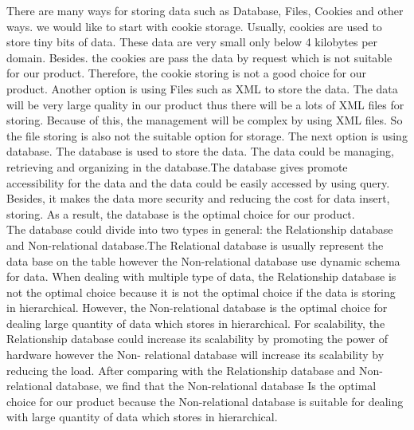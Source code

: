 \documentclass[10pt,draftclsnofoot,onecolumn,journal,compsoc]{IEEEtran}
\begin{document}
        \noindent There are many ways for storing data such as Database, Files, Cookies and other ways. we would like to start with cookie storage. Usually, cookies are used to store tiny bits of data. These data are very small only below 4 kilobytes per domain\cite{W1}. Besides. the cookies are pass the data by request which is not suitable for our product. Therefore, the cookie storing is not a good choice for our product. Another option is using Files such as XML to store the data. The data will be very large quality in our product thus there will be a lots of XML files for storing. Because of this, the management will be complex by using XML files. So the file storing is also not the suitable option for storage. The next option is using database. The database is used to store the data. The data could be managing, retrieving and organizing in the database\cite{W2}.The database gives promote accessibility for the data and the data could be easily accessed by using query. Besides, it makes the data more security and reducing the cost for data insert, storing\cite{W3}. As a result, the database is the optimal choice for our product.\\
        
        \noindent The database could divide into two types in general: the Relationship database and Non-relational database.The Relational database is usually represent the data base on the table however the Non-relational database use dynamic schema for data. When dealing with multiple type of data, the Relationship database is not the optimal choice because it is not the optimal choice if the data is storing in hierarchical. However, the Non-relational database is the optimal choice for  dealing large quantity of data which stores in hierarchical. For scalability, the Relationship database could increase its scalability by promoting the power of hardware however the Non- relational database will increase its scalability by reducing the load. After comparing with the Relationship database and Non-relational database, we find that the Non-relational database Is the optimal choice for our product because the Non-relational database is suitable for dealing with large quantity of data which stores in hierarchical\cite{W4}.\\
	
\end{document}
